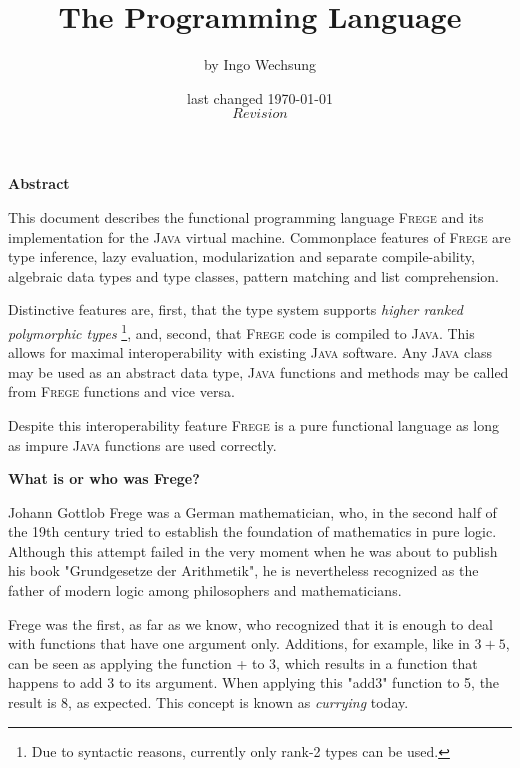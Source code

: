 \documentclass[a4paper,twocolumn,landscape]{report}
\date{last changed \today{} \\ $Revision$}
\author{\small{by Ingo Wechsung}}
\title{The \frege{} Programming Language}
\newcommand{\inmargin}[1]{\marginpar{\scriptsize\raggedright #1}}
\newcommand{\frege}[0]{\textsc{Frege}}
\newcommand{\java}{\textsc{Java}}
\newcommand{\qq}[1]{"#1"}
\begin{document}
\maketitle

\begin{twocolumn}

\begin{center}\textbf{Abstract}\end{center}
This document describes the functional programming language \frege{}
and its implementation
for the \java{} virtual machine. Commonplace features of \frege{} are
type inference,
lazy evaluation,
modularization and separate compile-ability,
algebraic data types and type classes,
pattern matching and list comprehension.

Distinctive features are, first, that the type system supports
\emph{higher ranked polymorphic types}
\footnote{Due to syntactic reasons, currently only rank-2 types can be used.},
and, second,
that \frege{} code is compiled to \java{}.
This allows for maximal interoperability with existing
\java{} software.
Any \java{} class may be used as an abstract data type, \java{}
functions and methods may be called from \frege{} functions and vice
versa.

Despite this interoperability feature  \frege{} is a pure functional language as long as impure \java{} functions are used correctly.

\begin{center}\textbf{What is or who was Frege?}\end{center}

Johann Gottlob Frege
was a
German mathematician, who, in the second half of the 19th
century tried to establish the foundation of mathematics in pure
logic. Although this attempt failed in the very moment when he
was about to publish his book \qq{Grundgesetze der Arithmetik},
he is nevertheless recognized as the father of modern logic among
philosophers and mathematicians.

Frege was the first, as far as we know, who recognized that it
is enough to deal with functions that have one argument only.
Additions, for example, like in $3+5$, can be seen as applying the
function + to 3,
which results in a function that
happens to add 3 to its argument. When applying this \qq{add3}
function to 5, the result is 8, as expected. This concept is known as
\emph{currying}  today.


\end{twocolumn}
\end{document}
